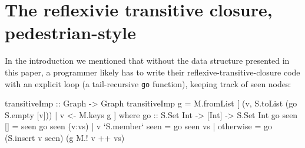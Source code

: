 \documentclass[manuscript,anonymous,screen,acmsmall]{acmart}
\begin{document}



\clearpage
\appendix
\section{The reflexivie transitive closure, pedestrian-style}\label{sec:imp}

In the introduction we mentioned that without the data structure presented in this paper, a programmer likely has to write their reflexive-transitive-closure code with an explicit loop (a tail-recursive \verb|go| function), keeping track of seen nodes:
\begin{code}
transitiveImp :: Graph -> Graph
transitiveImp g = M.fromList [ (v, S.toList (go S.empty [v])) | v <- M.keys g ]
  where
    go :: S.Set Int -> [Int] -> S.Set Int
    go seen [] = seen
    go seen (v:vs)  |  v `S.member` seen  =  go seen vs
                    |  otherwise          =  go (S.insert v seen) (g M.! v ++ vs)
\end{code}
\end{document}
